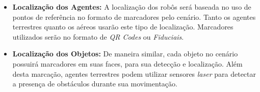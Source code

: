 \begin{itemize}
  \item \textbf{Localização dos Agentes:} A localização dos robôs será baseada no uso de pontos de referência no formato de marcadores pelo cenário. Tanto os agentes terrestres quanto os aéreos usarão este tipo de localização. Marcadores utilizados serão no formato de \emph{QR Codes} ou \emph{Fiduciais}.

  \item \textbf{Localização dos Objetos:} De maneira similar, cada objeto no cenário possuirá marcadores em suas faces, para sua detecção e localização. Além desta marcação, agentes terrestres podem utilizar sensores \emph{laser} para detectar a presença de obstáculos durante sua movimentação.

\end{itemize}

